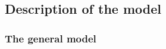 \documentclass[default]{sn-jnl}%
\theoremstyle{thmstyleone}%
\theoremstyle{thmstyletwo}%
\theoremstyle{thmstylethree}%
\begin{document}
%
\subsection{Description of the model}
\subsubsection{The general model}
\end{document}
